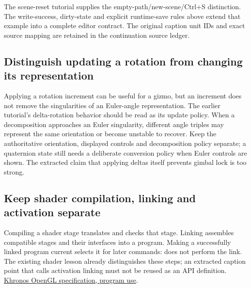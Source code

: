 The scene-reset tutorial supplies the empty-path/new-scene/Ctrl+S distinction. The write-success, dirty-state and explicit runtime-save rules above extend that example into a complete editor contract. The original caption unit IDs and exact source mapping are retained in the continuation source ledger.

\subsection{Distinguish updating a rotation from changing its representation}\label{06-engine-ii-ch046-distinguish-updating-a-rotation-from-changing-its-representation}

\hypertarget{06-engine-ii-ch046-distinguish-updating-a-rotation-from-changing-its-representation}{}

Applying a rotation increment can be useful for a gizmo, but an increment does not remove the singularities of an Euler-angle representation. The earlier tutorial's delta-rotation behavior should be read as its update policy. When a decomposition approaches an Euler singularity, different angle triples may represent the same orientation or become unstable to recover. Keep the authoritative orientation, displayed controls and decomposition policy separate; a quaternion state still needs a deliberate conversion policy when Euler controls are shown. The extracted claim that applying deltas itself prevents gimbal lock is too strong.

\subsection{Keep shader compilation, linking and activation separate}\label{06-engine-ii-ch046-keep-shader-compilation-linking-and-activation-separate}

\hypertarget{06-engine-ii-ch046-keep-shader-compilation-linking-and-activation-separate}{}

Compiling a shader stage translates and checks that stage. Linking assembles compatible stages and their interfaces into a program. Making a successfully linked program current selects it for later commands:  does not perform the link. The existing shader lesson already distinguishes these steps; an extracted caption point that calls activation linking must not be reused as an API definition. \href{https://registry.khronos.org/OpenGL/specs/gl/glspec46.compatibility.pdf}{Khronos OpenGL specification, program use}.

